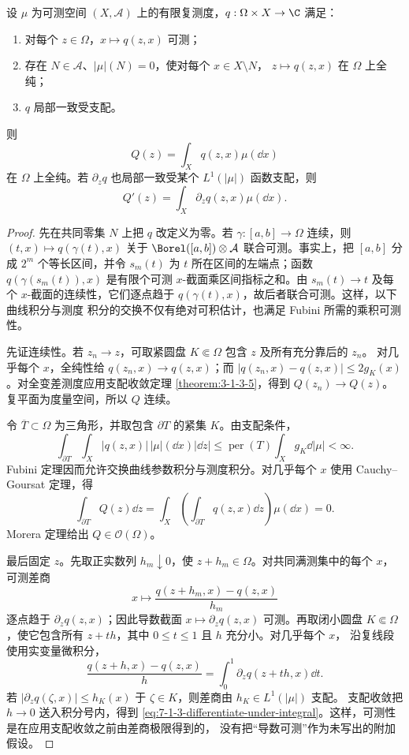 \begin{theorem}[参数积分全纯定理]\label{theorem:7-1-3-1}
设 $\mu$ 为可测空间 $(X,\mathcal A)$ 上的有限复测度，$q:\Omega\times X\to\C$ 满足：
\begin{enumerate}
  \item 对每个 $z\in\Omega$，$x\mapsto q(z,x)$ 可测；
  \item 存在 $N\in\mathcal A$、$|\mu|(N)=0$，使对每个 $x\in X\setminus N$，
        $z\mapsto q(z,x)$ 在 $\Omega$ 上全纯；
  \item $q$ 局部一致受支配。
\end{enumerate}
则
\[
  Q(z)=\int_Xq(z,x)\mu(\dd x)
\]
在 $\Omega$ 上全纯。若 $\partial_zq$ 也局部一致受某个 $L^1(|\mu|)$ 函数支配，则
\[
  Q'(z)=\int_X\partial_zq(z,x)\mu(\dd x).
  \tag{7.1.19}\label{eq:7-1-3-differentiate-under-integral}
\]
\end{theorem}

\begin{proof}
先在共同零集 $N$ 上把 $q$ 改定义为零。若 $\gamma:[a,b]\to\Omega$ 连续，则
$(t,x)\mapsto q(\gamma(t),x)$ 关于
$\Borel([a,b])\otimes\mathcal A$ 联合可测。事实上，把 $[a,b]$ 分成 $2^m$ 个等长区间，并令
$s_m(t)$ 为 $t$ 所在区间的左端点；函数
$q(\gamma(s_m(t)),x)$ 是有限个可测 $x$-截面乘区间指标之和。由 $s_m(t)\to t$ 及每个
$x$-截面的连续性，它们逐点趋于 $q(\gamma(t),x)$，故后者联合可测。这样，以下曲线积分与测度
积分的交换不仅有绝对可积估计，也满足 Fubini 所需的乘积可测性。

先证连续性。若 $z_n\to z$，可取紧圆盘 $K\Subset\Omega$ 包含 $z$ 及所有充分靠后的 $z_n$。
对几乎每个 $x$，全纯性给 $q(z_n,x)\to q(z,x)$；而
$|q(z_n,x)-q(z,x)|\le2g_K(x)$。对全变差测度应用支配收敛定理
\ref{theorem:3-1-3-5}，得到 $Q(z_n)\to Q(z)$。复平面为度量空间，所以 $Q$ 连续。

令 $\overline T\subset\Omega$ 为三角形，并取包含 $\partial T$ 的紧集 $K$。由支配条件，
\[
 \int_{\partial T}\int_X|q(z,x)|\,|\mu|(\dd x)|\dd z|
 \le\operatorname{per}(T)\int_Xg_K\dd|\mu|<\infty.
\]
Fubini 定理因而允许交换曲线参数积分与测度积分。对几乎每个 $x$ 使用 Cauchy--Goursat 定理，得
\[
 \int_{\partial T}Q(z)\dd z
 =\int_X\left(\int_{\partial T}q(z,x)\dd z\right)\mu(\dd x)=0.
\]
Morera 定理给出 $Q\in\mathcal O(\Omega)$。

最后固定 $z$。先取正实数列 $h_m\downarrow0$，使 $z+h_m\in\Omega$。对共同满测集中的每个
$x$，可测差商
\[
 x\longmapsto\frac{q(z+h_m,x)-q(z,x)}{h_m}
\]
逐点趋于 $\partial_zq(z,x)$；因此导数截面 $x\mapsto\partial_zq(z,x)$ 可测。再取闭小圆盘
$K\Subset\Omega$，使它包含所有 $z+th$，其中 $0\le t\le1$ 且 $h$ 充分小。对几乎每个 $x$，
沿复线段使用实变量微积分，
\[
 \frac{q(z+h,x)-q(z,x)}h
 =\int_0^1\partial_zq(z+th,x)\dd t.
\]
若 $|\partial_zq(\zeta,x)|\le h_K(x)$ 于 $\zeta\in K$，则差商由 $h_K\in L^1(|\mu|)$ 支配。
支配收敛把 $h\to0$ 送入积分号内，得到
\eqref{eq:7-1-3-differentiate-under-integral}。这样，可测性是在应用支配收敛之前由差商极限得到的，
没有把“导数可测”作为未写出的附加假设。
\end{proof}

